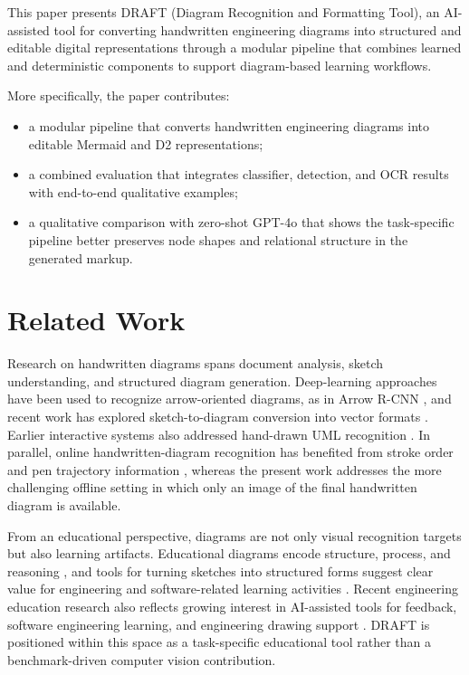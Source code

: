 \documentclass[conference]{IEEEtran}
\begin{document}
This paper presents DRAFT (Diagram Recognition and Formatting Tool), an AI-assisted tool for converting handwritten engineering diagrams into structured and editable digital representations through a modular pipeline that combines learned and deterministic components to support diagram-based learning workflows.

More specifically, the paper contributes:
\begin{itemize}
\item a modular pipeline that converts handwritten engineering diagrams into editable Mermaid and D2 representations;
\item a combined evaluation that integrates classifier, detection, and OCR results with end-to-end qualitative examples;
\item a qualitative comparison with zero-shot GPT-4o that shows the task-specific pipeline better preserves node shapes and relational structure in the generated markup.
\end{itemize}

\section{Related Work}
Research on handwritten diagrams spans document analysis, sketch understanding, and structured diagram generation. Deep-learning approaches have been used to recognize arrow-oriented diagrams, as in Arrow R-CNN \cite{arrowrcnn}, and recent work has explored sketch-to-diagram conversion into vector formats \cite{sketchdiagram}. Earlier interactive systems also addressed hand-drawn UML recognition \cite{interactiveUML}. In parallel, online handwritten-diagram recognition has benefited from stroke order and pen trajectory information \cite{online1,online2,online3,framework}, whereas the present work addresses the more challenging offline setting in which only an image of the final handwritten diagram is available.

From an educational perspective, diagrams are not only visual recognition targets but also learning artifacts. Educational diagrams encode structure, process, and reasoning \cite{ai2d}, and tools for turning sketches into structured forms suggest clear value for engineering and software-related learning activities \cite{interactiveUML,modelsketch}. Recent engineering education research also reflects growing interest in AI-assisted tools for feedback, software engineering learning, and engineering drawing support \cite{isetGenAISE,inquisitiveAI,genAIDrawingsFeedback}. DRAFT is positioned within this space as a task-specific educational tool rather than a benchmark-driven computer vision contribution.
\end{document}
